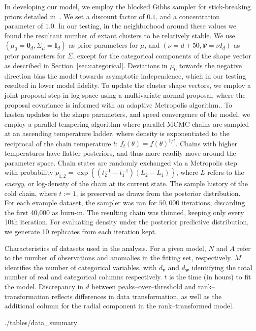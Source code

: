 In developing our model, we employ the blocked Gibbs sampler for stick-breaking
    priors detailed in~\cite{ishwaran2001}.  We set a discount factor of $0.1$, 
    and a concentration parameter of $1.0$.  In our testing, in the neighborhood
    around these values we found the resultant number of extant clusters to be 
    relatively stable.  We use $(\mu_0 = \bm{0}_d,\Sigma_{\mu} = \bm{I}_d)$ as 
    prior parameters for $\mu$, and $(\nu = d + 50,\Psi = \nu I_d)$ as prior 
    parameters for $\Sigma$, except for the categorical components of the shape 
    vector as described in Section~\ref{sec:categorical}.  Deviations in $\mu_0$ 
    towards the negative direction bias the model towards asymptotic 
    independence, which in our testing resulted in lower model fidelity.
    To update the cluster shape vectors, we employ a joint proposal step in 
    log-space using a multivariate normal proposal, where the proposal 
    covariance is informed with an adaptive Metropolis 
    algorithm.\citep{Haario2001}.  To hasten updates to the shape
    parameters, and speed convergence of the model, we employ a parallel
    tempering algorithm where parallel MCMC chains are sampled at an ascending
    temperature ladder, where density is exponentiated to the reciprocal of the
    chain temperature $t$: $f_t(\theta) = f(\theta)^{1/t}$.  Chains with 
    higher temperatures have flatter posteriors, and thus more readily move 
    around the parameter space.  Chain states are randomly exchanged via a 
    Metropolis step with probability
    $p_{1,2} = \exp\left\lbrace (t_2^{-1} - t_1^{-1})(L_2-L_1)\right\rbrace$,
    where $L$ refers to the \emph{energy}, or log-density of the chain at 
    its current state. The sample history of the cold chain, where $t:=1$, 
    is preserved as draws from the posterior distribution.
    For each example dataset, the sampler was ran for $50,000$ iterations,
    discarding the first 40,000 as burn-in.  The resulting chain was thinned,
    keeping only every 10th iteration.  For evaluating density under the 
    posterior predictive distribution, we generate 10 replicates from each
    iteration kept.

\begin{table}[t]
    \centering
    \caption{
    Characteristics of datasets used in the analysis.  For a given model, 
    $N$ and $A$ refer to the number of observations and anomalies in the 
    fitting set, respectively. $M$ identifies the number of categorical 
    variables, with $d_{\bm{v}}$ and $d_{\bm{w}}$ identifying the total number 
    of real and categorical columns respectively.  $t$ is the time (in hours) 
    to fit the model.  Discrepancy in $d$ between peaks--over--threshold 
    and rank--transformation reflects differences in data transformation,
    as well as the additional column for the radial component in the
    rank--transformed model.\label{tab:data}
    }
    \bigskip
    \scriptsize
    \setlength\tabcolsep{3pt}
     {./tables/data_summary}
    \setlength\tabcolsep{3pt}
\end{table}

